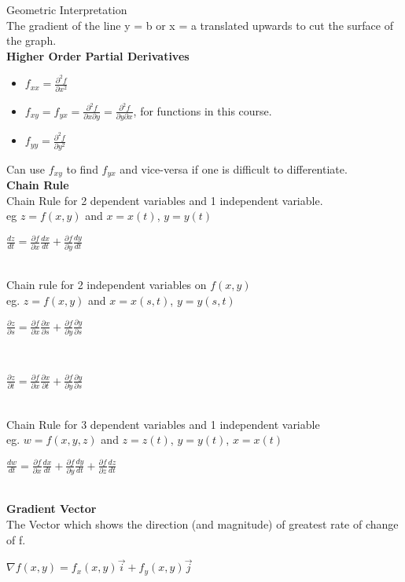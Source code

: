 \documentclass[10pt, a4paper]{article}
\begin{document}
\begin{multicols*}{3}
	Geometric Interpretation\\
	The gradient of the line y = b or x = a translated upwards to cut the surface of the graph. \\
	
	 \textbf{Higher Order Partial Derivatives}
	 \begin{itemize}
	 	\setlength\itemsep{0em}
	 	\item $f_{xx} = \frac{\partial^2f}{\partial x^2}$
	 	\item $f_{xy} = f_{yx} = \frac{\partial^2 f}{\partial x \partial y} = \frac{\partial^2 f}{\partial y \partial x}$, for functions in this course.
	 	\item $f_{yy} = \frac{\partial^2 f}{\partial y^2}$
 	\end{itemize}
   Can use $f_{xy}$ to find $f_{yx}$ and vice-versa if one is difficult to differentiate.\\
   
   \textbf{Chain Rule} \\
   Chain Rule for 2 dependent variables and 1 independent variable. \\eg $z = f(x, y)$ and $x = x(t)$, $y = y(t)$\\
   \centerline{$\frac{dz}{dt} = \frac{\partial f}{\partial x}\frac{dx}{dt} + \frac{\partial f}{\partial y}\frac{dy}{dt}$}\\
   
   Chain rule for 2 independent variables on $f(x, y)$\\
   eg. $z = f(x, y)$ and $x = x(s, t)$, $y = y(s, t)$\\
   \centerline{$\frac{\partial z}{\partial s} = \frac{\partial f}{\partial x} \frac{\partial x}{\partial s} + \frac{\partial f}{\partial y} \frac{\partial y}{\partial s}$}\\
   \centerline{$\frac{\partial z}{\partial t} = \frac{\partial f}{\partial x}\frac{\partial x}{\partial t} + \frac{\partial f}{\partial y}\frac{\partial y}{\partial s}$}\\
   
   Chain Rule for 3 dependent variables and 1 independent variable\\
   eg. $w = f(x, y, z)$ and $z = z(t)$, $y = y(t)$, $x = x(t)$\\
   \centerline{$\frac{dw}{dt} = \frac{\partial f}{\partial x}\frac{dx}{dt} + \frac{\partial f}{\partial y}\frac{dy}{dt} + \frac{\partial f}{\partial z}\frac{dz}{dt}$}\\
   
   \textbf{Gradient Vector}\\
   The Vector which shows the direction (and magnitude) of greatest rate of change of f.\\
   \centerline{$\nabla f(x, y) = f_x(x, y)\overrightarrow{i} + f_y(x, y)\overrightarrow{j}$}\\
   

\end{multicols*}
\end{document}

